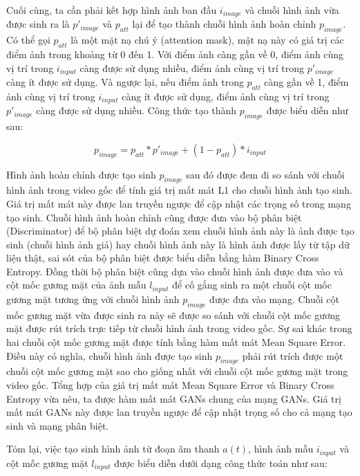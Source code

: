 Cuối cùng, ta cần phải kết hợp hình ảnh ban đầu $i_{image}$ và chuỗi hình ảnh vừa được sinh ra là $p'_{image}$ và $p_{att}$ lại để tạo thành chuỗi hình ảnh hoàn chỉnh $p_{image}$. Có thể gọi $p_{att}$ là một mặt nạ chú ý (attention mask), mặt nạ này có giá trị các điểm ảnh trong khoảng từ 0 đến 1. Với điểm ảnh càng gần về 0, điểm ảnh cùng vị trí trong $i_{input}$ càng được sử dụng nhiều, điểm ảnh cùng vị trí trong $p'_{image}$ càng ít được sử dụng. Và ngược lại, nếu điểm ảnh trong $p_{att}$ càng gần về 1, điểm ảnh cùng vị trí trong $i_{input}$ càng ít được sử dụng, điểm ảnh cùng vị trí trong $p'_{image}$ càng được sử dụng nhiều. Công thức tạo thành $p_{image}$ được biểu diễn như sau:

\begin{equation}
    p_{image}=p_{att}*p'_{image}+(1-p_{att})*i_{input}
\end{equation}

Hình ảnh hoàn chỉnh được tạo sinh $p_{image}$ sau đó được đem đi so sánh với chuỗi hình ảnh trong video gốc để tính giá trị mất mát L1 cho chuỗi hình ảnh tạo sinh. Giá trị mất mát này được lan truyền ngược để cập nhật các trọng số trong mạng tạo sinh. Chuỗi hình ảnh hoàn chỉnh cũng được đưa vào bộ phân biệt (Discriminator) để bộ phân biệt dự đoán xem chuỗi hình ảnh này là ảnh được tạo sinh (chuỗi hình ảnh giả) hay chuỗi hình ảnh này là hình ảnh được lấy từ tập dữ liệu thật, sai sót của bộ phân biệt được biểu diễn bằng hàm Binary Cross Entropy. Đồng thời bộ phân biệt cũng dựa vào chuỗi hình ảnh được đưa vào và cột mốc gương mặt của ảnh mẫu $l_{input}$ để cố gắng sinh ra một chuỗi cột mốc gương mặt tương ứng với chuỗi hình ảnh $p_{image}$ được đưa vào mạng. Chuỗi cột mốc gương mặt vừa được sinh ra này sẽ được so sánh với chuỗi cột mốc gương mặt được rút trích trực tiếp từ chuỗi hình ảnh trong video gốc. Sự sai khác trong hai chuỗi cột mốc gương mặt được tính bằng hàm mất mát Mean Square Error. Điều này có nghĩa, chuỗi hình ảnh được tạo sinh $p_{image}$ phải rút trích được một chuỗi cột mốc gương mặt sao cho giống nhất với chuỗi cột mốc gương mặt trong video gốc. Tổng hợp của giá trị mất mát Mean Square Error và Binary Cross Entropy vừa nêu, ta được hàm mất mát GANs chung của mạng GANs. Giá trị mất mát GANs này được lan truyền ngược để cập nhật trọng số cho cả mạng tạo sinh và mạng phân biệt.

Tóm lại, việc tạo sinh hình ảnh từ đoạn âm thanh $a(t)$, hình ảnh mẫu $i_{input}$ và cột mốc gương mặt $l_{input}$ được biểu diễn dưới dạng công thức toán như sau:

